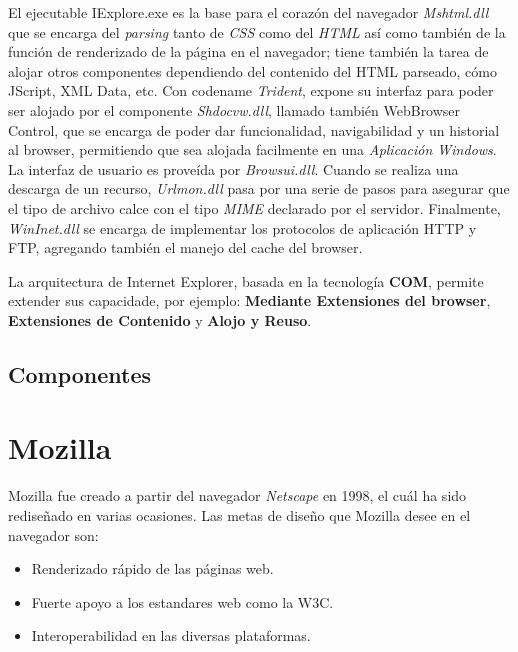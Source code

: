         
        El ejecutable IExplore.exe es la base para el corazón del navegador \textit{Mshtml.dll} que se encarga del \textit{parsing} tanto de \textit{CSS} como del \textit{HTML} así como también de la función de renderizado de la página en el navegador; tiene también la tarea de alojar otros componentes dependiendo del contenido del HTML parseado, cómo JScript, XML Data, etc. Con codename \textit{Trident}, expone su interfaz para poder ser alojado por el componente \textit{Shdocvw.dll}, llamado también WebBrowser Control, que se encarga de poder dar funcionalidad, navigabilidad y un historial al browser, permitiendo que sea alojada facilmente en una \textit{Aplicación Windows}. La interfaz de usuario es proveída por \textit{Browsui.dll}. Cuando se realiza una descarga de un recurso, \textit{Urlmon.dll} pasa por una serie de pasos para asegurar que el tipo de archivo calce con el tipo \textit{MIME} declarado por el servidor. Finalmente, \textit{WinInet.dll} se encarga de implementar los protocolos de aplicación HTTP y FTP, agregando también el manejo del cache del browser.
        
        La arquitectura de Internet Explorer, basada en la tecnología \textbf{COM}, permite extender sus capacidade, por ejemplo: \textbf{Mediante Extensiones del browser}, \textbf{Extensiones de Contenido} y \textbf{Alojo y Reuso}.

\subsection{Componentes}


\section{Mozilla}

Mozilla fue creado a partir del navegador \textit{Netscape} en 1998, el cuál ha sido rediseñado en varias ocasiones. Las metas de diseño que Mozilla desee en el navegador son:
        \begin{itemize}
            \item Renderizado rápido de las páginas web.
            \item Fuerte apoyo a los estandares web como la W3C.
            \item Interoperabilidad en las diversas plataformas.
        \end{itemize}
        
